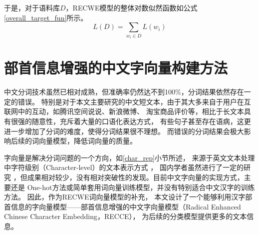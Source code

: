 于是，对于语料库$D$，RECWE模型的整体对数似然函数如公式\ref{overall_target_fun}所示。
\begin{equation}
    L\left ( D \right )=\sum_{w_i \in D}L\left ( w_i \right )
    \label{overall_target_fun}
\end{equation}





\section{部首信息增强的中文字向量构建方法}
中文分词技术虽然已相对成熟，但准确率仍然达不到100\%，分词结果依然存在一定的错误。
特别是对于本文主要研究的中文短文本，由于其大多来自于用户在互联网中的互动，如腾讯空间说说、新浪微博、
淘宝商品评价等，相比于长文本具有很强的随意性，充斥着大量的口语化表达方式，
有些句子甚至存在语病，这更进一步增加了分词的难度，使得分词结果很不理想。
而错误的分词结果会极大影响后续的词向量模型，降低词向量的质量。

字向量是解决分词问题的一个方向，如\ref{char_rep}小节所述，
来源于英文文本处理中字符级别（Character-level）的文本表示方式
，
国内学者虽然进行了一定的研究
，但成果相对较少，没有相对突破性的发现。目前中文字向量的实现方式，主要还是
One-hot方法或简单套用词向量训练模型，并没有特别适合中文汉字的训练方法。
因此，作为RECWE词向量模型的补充，
本文设计了一个能够利用汉字部首信息的字向量模型——部首信息增强的中文字向量模型（Radical Enhanced Chinese Character Embedding，RECCE），
为后续的分类模型提供更多的文本信息。


